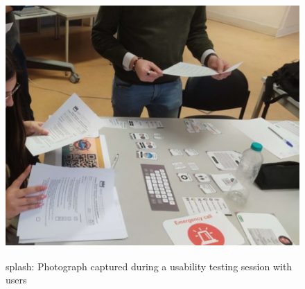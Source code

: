 \begin{figure}[H]
    \centering
    \includegraphics[width=13cm,height=10cm]{figs/mockup-tests.png}
    \caption{\ac{splash}: Photograph captured during a usability testing session with users}
    \label{fig:usability-testing}
\end{figure}

